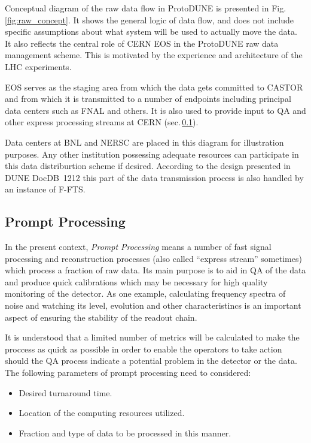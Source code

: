 \documentclass[pdftex,12pt,letter]{article}
\newcommand{\pd}{ProtoDUNE\xspace}
\begin{document}
\noindent
Conceptual diagram of the raw data flow in \pd is presented in Fig.\ref{fig:raw_concept}. It shows the general logic
of data flow, and does not include specific assumptions about what system will be used to actually move the data.
It also reflects the central role of CERN EOS in the \pd raw data management scheme. This is motivated by the experience
and architecture of the LHC experiments.

EOS serves as the staging area from which the data gets committed to CASTOR
and from which it is transmitted to a number of endpoints including principal data centers such as FNAL and others.
It is also used to provide input to QA and other express processing streams at CERN (sec.\,\ref{sec:prompt_processing}).

Data centers at BNL and NERSC are placed in this diagram for illustration purposes. Any other institution possessing adequate
resources can participate in this data distriburtion scheme if desired. According to the design presented in DUNE DocDB~1212
this part of the data transmission process is also handled by an instance of F-FTS.


\subsection{Prompt Processing}
\label{sec:prompt_processing}
In the present context, \textit{Prompt Processing} means a number of fast signal processing and reconstruction processes
(also called ``express stream'' sometimes) which process a fraction of raw data. Its main purpose is to aid in QA of the data
and produce quick calibrations which may be necessary for high quality monitoring of the detector. As one example,
calculating frequency spectra of noise and watching its level, evolution and other characteristincs is an important aspect of ensuring
the stability of the readout chain.

It is understood
that a limited number of metrics will be calculated to make the proccess as quick as possible in order to enable
the operators to take action should the QA process indicate a potential problem in the detector or the data.
The following parameters of prompt processing need to considered:
\begin{itemize}
\item Desired turnaround time.
\item Location of the computing resources utilized.
\item Fraction and type of data to be processed in this manner.
\end{itemize}
\end{document}
